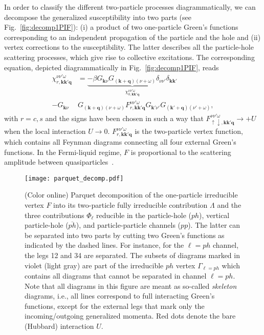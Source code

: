 \documentclass[rmp,aps,reprint,amsmath,amssymb,superscriptaddress,showpacs,nofootinbib]{revtex4-1}
\begin{document}
In order to classify the different two-particle processes diagrammatically, we can decompose the generalized susceptibility into two parts (see  Fig.~\ref{fig:decomp1PIF}): (i) a product of two one-particle Green's functions corresponding to an independent propagation of the particle and the hole and (ii) vertex corrections to the susceptibility. The latter  describes all the particle-hole scattering processes, which give rise to collective excitations. The corresponding equation, depicted diagrammatically in Fig.~\ref{fig:decomp1PIF}, reads
\begin{align} 
 \label{equ:defvertex} 
 \chi_{r,\mathbf{k}\mathbf{k'}\mathbf{q}}^{\nu\nu'\omega}&=\underset{\chi_{0,\mathbf{k}\mathbf{k'}\mathbf{q}}^{\nu\nu'\omega}}{\underbrace{-\beta G_{\mathbf{k}\nu}G_{(\mathbf{k}+\mathbf{q})(\nu+\omega)}\delta_{\nu\nu'}\delta_{\mathbf{k}\mathbf{k'}}}}\nonumber\\- G_{\mathbf{k}\nu}&G_{(\mathbf{k}+\mathbf{q})(\nu+\omega)}F_{r,\mathbf{k}\mathbf{k'}\mathbf{q}}^{\nu\nu'\omega}G_{\mathbf{k'}\nu'}G_{(\mathbf{k'}+\mathbf{q})(\nu'+\omega)},
\end{align}
with $r=c,s$ and the signs have been chosen in such a way that $F_{\uparrow\downarrow,\mathbf{k}\mathbf{k'}\mathbf{q}}^{\nu\nu'\omega}\rightarrow +U$ when the local interaction $U\rightarrow 0$. $F_{r,\mathbf{k}\mathbf{k'}\mathbf{q}}^{\nu\nu'\omega}$ is the two-particle vertex function, which  contains all Feynman diagrams connecting all four external Green's functions. In the Fermi-liquid regime, $F$ is proportional to the scattering amplitude between quasiparticles~\cite{Abrikosov1975}.
\begin{figure*}[t]
  \centering 
  \texttt{[image: parquet\_decomp.pdf]} 
    \caption {(Color online) Parquet decomposition of the one-particle irreducible vertex $F$ into its two-particle fully irreducible contribution $\Lambda$ and the three  contributions $\Phi_{\ell}$ reducible in the particle-hole ($ph$), vertical particle-hole ($\overline{ph}$), and particle-particle channels ($pp$). The latter can be separated into two parts by cutting two Green's functions as indicated by the dashed lines. For instance, for the  $\ell=ph$ channel, the legs  12 and 34 are separated. The subsets of diagrams marked in violet (light gray) are part of the irreducible $ph$ vertex $\Gamma_{\ell=ph}$ which contains all diagrams that cannot be separated in channel $\ell=ph$. Note that all diagrams in this figure are meant as so-called {\sl skeleton} diagrams, i.e., all lines correspond to full interacting Green's functions, except for the external legs that mark only the incoming/outgoing generalized momenta. Red dots denote the bare (Hubbard) interaction $U$.}
  \label{fig:decomp2PILambda} 
\end{figure*} 
\end{document}
